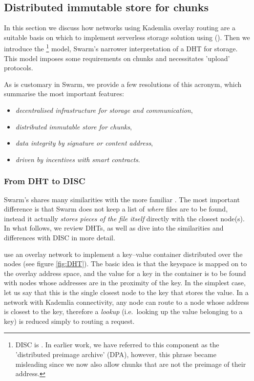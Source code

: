\subsection{Distributed immutable store for chunks\statusgreen}\label{sec:disc}
 
In this section we discuss how networks using Kademlia overlay routing are a suitable basis on which to implement  serverless storage solution using  (). Then we introduce the %
%
\footnote{DISC is . In earlier work, we have referred to this component as the 'distributed preimage archive' (DPA), however, this phrase became misleading since we now also allow chunks that are not the preimage of their address.}
% 
model, Swarm's narrower interpretation of a DHT for storage. This model 
imposes some requirements on chunks and necessitates 'upload' protocols. 

As is customary in Swarm, we provide a few resolutions of this acronym, which summarise the most important features:


\begin{itemize}
\item \emph{decentralised infrastructure for storage and communication}, 
\item \emph{distributed immutable store for chunks}, 
\item \emph{data integrity by signature or content address},
\item \emph{driven by incentives with smart contracts}. 

\end{itemize}
 
\subsubsection{From DHT to DISC}
Swarm's  shares many similarities with the more familiar . The most important difference is that Swarm does not keep a list of \emph{where} files are to be found, instead it actually \emph{stores pieces of the file itself} directly with the closest node(s). 
In what follows, we review DHTs, as well as dive into the similarities and differences with DISC in more detail. 
 
 use an overlay network to implement a key--value container distributed over the nodes (see figure \ref{fig:DHT}). The basic idea is that the keyspace is mapped on to the overlay address space, and the value for a key in the container is to be found with nodes whose addresses are in the proximity of the key. In the simplest case, let us say that this is the single closest node to the key that stores the value. In a network with Kademlia connectivity, any node can route to a node whose address is closest to the key, therefore a \emph{lookup} (i.e.\ looking up the value belonging to a key) is reduced simply to routing a request. 

